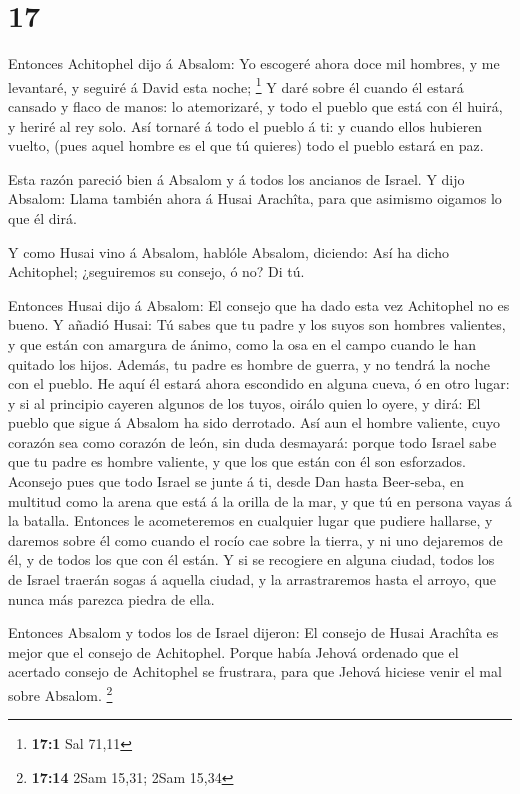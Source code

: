 \hypertarget{section-16}{%
\section{17}\label{section-16}}

 Entonces Achitophel dijo á Absalom: Yo escogeré ahora doce
mil hombres, y me levantaré, y seguiré á David esta noche; \footnote{\textbf{17:1}
  Sal 71,11}  Y daré sobre él cuando él estará cansado y
flaco de manos: lo atemorizaré, y todo el pueblo que está con él huirá,
y heriré al rey solo.  Así tornaré á todo el pueblo á ti: y
cuando ellos hubieren vuelto, (pues aquel hombre es el que tú quieres)
todo el pueblo estará en paz.

 Esta razón pareció bien á Absalom y á todos los ancianos de
Israel.  Y dijo Absalom: Llama también ahora á Husai
Arachîta, para que asimismo oigamos lo que él dirá.

 Y como Husai vino á Absalom, hablóle Absalom, diciendo: Así
ha dicho Achitophel; ¿seguiremos su consejo, ó no? Di tú.

 Entonces Husai dijo á Absalom: El consejo que ha dado esta
vez Achitophel no es bueno.  Y añadió Husai: Tú sabes que tu
padre y los suyos son hombres valientes, y que están con amargura de
ánimo, como la osa en el campo cuando le han quitado los hijos. Además,
tu padre es hombre de guerra, y no tendrá la noche con el pueblo.
 He aquí él estará ahora escondido en alguna cueva, ó en
otro lugar: y si al principio cayeren algunos de los tuyos, oirálo quien
lo oyere, y dirá: El pueblo que sigue á Absalom ha sido derrotado.
 Así aun el hombre valiente, cuyo corazón sea como corazón
de león, sin duda desmayará: porque todo Israel sabe que tu padre es
hombre valiente, y que los que están con él son esforzados.
 Aconsejo pues que todo Israel se junte á ti, desde Dan
hasta Beer-seba, en multitud como la arena que está á la orilla de la
mar, y que tú en persona vayas á la batalla.  Entonces le
acometeremos en cualquier lugar que pudiere hallarse, y daremos sobre él
como cuando el rocío cae sobre la tierra, y ni uno dejaremos de él, y de
todos los que con él están.  Y si se recogiere en alguna
ciudad, todos los de Israel traerán sogas á aquella ciudad, y la
arrastraremos hasta el arroyo, que nunca más parezca piedra de ella.

 Entonces Absalom y todos los de Israel dijeron: El consejo
de Husai Arachîta es mejor que el consejo de Achitophel. Porque había
Jehová ordenado que el acertado consejo de Achitophel se frustrara, para
que Jehová hiciese venir el mal sobre Absalom. \footnote{\textbf{17:14}
  2Sam 15,31; 2Sam 15,34}


